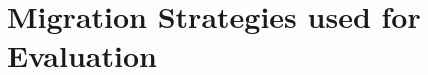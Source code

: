 
\chapter[Migration Strategies used for Evaluation][Migration Strategies]{Migration Strategies used for Evaluation}
\label{MigrationStrategies}
